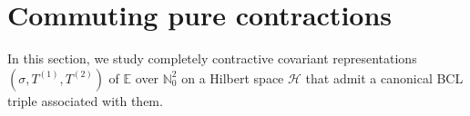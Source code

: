 \documentclass[12pt]{amsart}
\numberwithin{equation}{section}
\theoremstyle{plain}
\newcommand{\be}{\mathbb E}
\newcommand{\ot}{\otimes}
\newcommand{\wt}{\widetilde}
\newcommand{\wT}{\wt{T}}
\begin{document}
\section{Commuting pure contractions}


In this section, we study completely contractive covariant representations $(\sigma, T^{(1)}, T^{(2)})$ of $\be$ over $\mathbb N^2_0$ on a Hilbert space $\mathcal{H}$ that admit a canonical BCL triple associated with them. %
\end{document}
